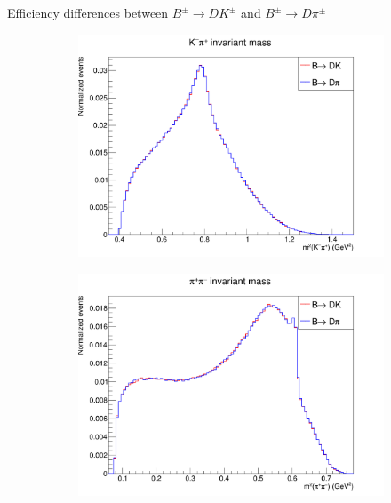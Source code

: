 \documentclass{beamer}
\begin{document}
\begin{frame}{Efficiency differences between $B^\pm\to DK^\pm$ and $B^\pm\to D\pi^\pm$}
\begin{figure}
\begin{subfigure}{0.33\textwidth}
    \end{subfigure}%
    \begin{subfigure}{0.33\textwidth}
      \includegraphics[width = 1.0\textwidth]{Plots/Dalitz_s12.png}
    \end{subfigure}
    \begin{subfigure}{0.33\textwidth}
      \includegraphics[width = 1.0\textwidth]{Plots/Dalitz_s23.png}
    \end{subfigure}%
    \begin{subfigure}{0.33\textwidth}

\end{subfigure}
\end{figure}
\end{frame}
\end{document}
